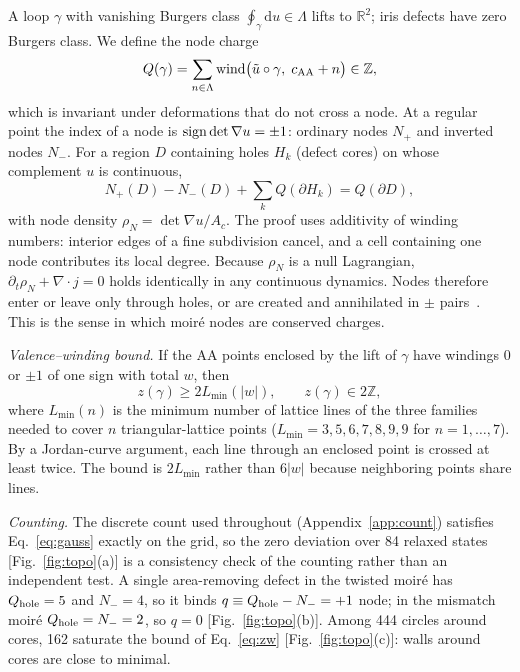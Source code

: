 \documentclass[prb,twocolumn,superscriptaddress,floatfix,10pt]{revtex4-2}
\newcommand{\dd}{\mathrm{d}}
\begin{document}
A loop $\gamma$ with vanishing Burgers class $\oint_\gamma\dd u\in\Lambda$ lifts to $\mathbb{R}^2$; iris defects have zero Burgers class. We define the node charge
\begin{equation}
Q(\gamma)=\sum_{n\in\Lambda}{\rm wind}\big(\tilde u\circ\gamma,\;c_{\rm AA}+n\big)\in\mathbb{Z},
\end{equation}
which is invariant under deformations that do not cross a node. At a regular point the index of a node is ${\rm sign}\det\nabla u=\pm1$: ordinary nodes $N_+$ and inverted nodes $N_-$. For a region $D$ containing holes $H_k$ (defect cores) on whose complement $u$ is continuous,
\begin{equation}
N_+(D)-N_-(D)+\sum_k Q(\partial H_k)=Q(\partial D),
\label{eq:gauss}
\end{equation}
with node density $\rho_N=\det\nabla u/A_c$.
The proof uses additivity of winding numbers: interior edges of a fine subdivision cancel, and a cell containing one node contributes its local degree. Because $\rho_N$ is a null Lagrangian, $\partial_t\rho_N+\nabla\cdot j=0$ holds identically in any continuous dynamics. Nodes therefore enter or leave only through holes, or are created and annihilated in $\pm$ pairs~\cite{Mermin1979}. This is the sense in which moir\'e nodes are conserved charges.

\emph{Valence--winding bound.} If the AA points enclosed by the lift of $\gamma$ have windings $0$ or $\pm1$ of one sign with total $w$, then
\begin{equation}
z(\gamma)\ge 2L_{\min}(|w|),\qquad z(\gamma)\in2\mathbb{Z},
\label{eq:zw}
\end{equation}
where $L_{\min}(n)$ is the minimum number of lattice lines of the three families needed to cover $n$ triangular-lattice points ($L_{\min}=3,5,6,7,8,9,9$ for $n=1,\dots,7$). By a Jordan-curve argument, each line through an enclosed point is crossed at least twice. The bound is $2L_{\min}$ rather than $6|w|$ because neighboring points share lines.

\emph{Counting.} The discrete count used throughout (Appendix~\ref{app:count}) satisfies Eq.~\eqref{eq:gauss} exactly on the grid, so the zero deviation over 84 relaxed states [Fig.~\ref{fig:topo}(a)] is a consistency check of the counting rather than an independent test. A single area-removing defect in the twisted moir\'e has $Q_{\rm hole}=5$ and $N_-=4$, so it binds $q\equiv Q_{\rm hole}-N_-=+1$ node; in the mismatch moir\'e $Q_{\rm hole}=N_-=2$, so $q=0$ [Fig.~\ref{fig:topo}(b)]. Among 444 circles around cores, 162 saturate the bound of Eq.~\eqref{eq:zw} [Fig.~\ref{fig:topo}(c)]: walls around cores are close to minimal.
\end{document}

